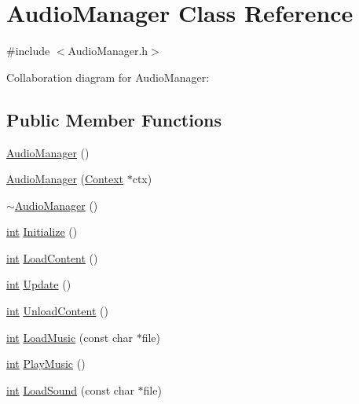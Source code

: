 \hypertarget{class_audio_manager}{\section{Audio\-Manager Class Reference}
\label{class_audio_manager}
}


{\ttfamily \#include $<$Audio\-Manager.\-h$>$}



Collaboration diagram for Audio\-Manager\-:
\subsection*{Public Member Functions}
\begin{DoxyCompactItemize}
\item 
\hyperlink{class_audio_manager_ae59d8605c1d706e7bab47d4e8f900d09}{Audio\-Manager} ()
\item 
\hyperlink{class_audio_manager_aadf31314ba383af86f1afcaa44d9b7e7}{Audio\-Manager} (\hyperlink{class_context}{Context} $\ast$ctx)
\item 
\hyperlink{class_audio_manager_ad94dc46723c6d7cf8c81fc3772a842aa}{$\sim$\-Audio\-Manager} ()
\item 
\hyperlink{_s_d_l__thread_8h_a6a64f9be4433e4de6e2f2f548cf3c08e}{int} \hyperlink{class_audio_manager_a8a12488d1fe834184d27dbd4b042593a}{Initialize} ()
\item 
\hyperlink{_s_d_l__thread_8h_a6a64f9be4433e4de6e2f2f548cf3c08e}{int} \hyperlink{class_audio_manager_a8272facf35d9fa66857f7364a1f487ae}{Load\-Content} ()
\item 
\hyperlink{_s_d_l__thread_8h_a6a64f9be4433e4de6e2f2f548cf3c08e}{int} \hyperlink{class_audio_manager_a924f832983f956a72599806ec4286ab5}{Update} ()
\item 
\hyperlink{_s_d_l__thread_8h_a6a64f9be4433e4de6e2f2f548cf3c08e}{int} \hyperlink{class_audio_manager_a755335689f2574e0c283128acbdd44e8}{Unload\-Content} ()
\item 
\hyperlink{_s_d_l__thread_8h_a6a64f9be4433e4de6e2f2f548cf3c08e}{int} \hyperlink{class_audio_manager_a16ff10a66586f4f93c635d465f1833f2}{Load\-Music} (const char $\ast$file)
\item 
\hyperlink{_s_d_l__thread_8h_a6a64f9be4433e4de6e2f2f548cf3c08e}{int} \hyperlink{class_audio_manager_ac7306cf16ab74b3834fd364f02587141}{Play\-Music} ()
\item 
\hyperlink{_s_d_l__thread_8h_a6a64f9be4433e4de6e2f2f548cf3c08e}{int} \hyperlink{class_audio_manager_aed5aa44ab8b15588a7790fe3edf40eca}{Load\-Sound} (const char $\ast$file)

\end{DoxyCompactItemize}
